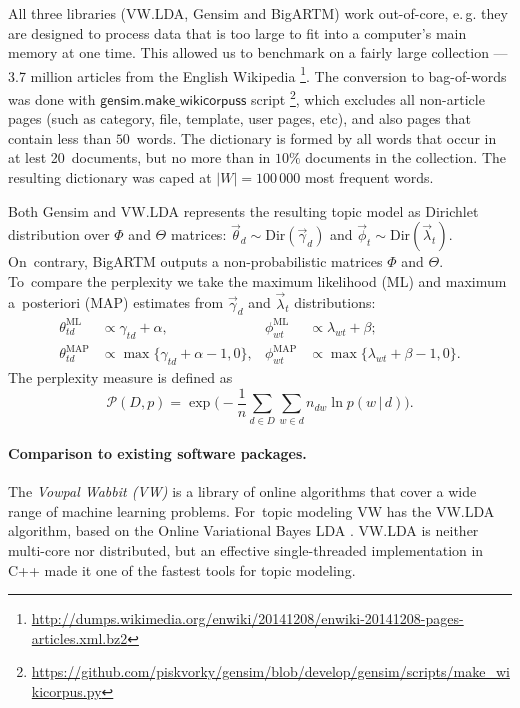 \documentclass[russian]{llncs}
\newcommand{\cond}{\mspace{3mu}{|}\mspace{3mu}}
\newcommand{\kw}[1]{\textsf{#1}}
\begin{document}
All three libraries (VW.LDA, Gensim and BigARTM) work out-of-core,
e.\,g. they are designed to process data that is too large to fit into a computer's main memory at one time.
This allowed us to benchmark on a fairly large collection --- 3.7 million articles from the English Wikipedia%
\footnote{\url{http://dumps.wikimedia.org/enwiki/20141208/enwiki-20141208-pages-articles.xml.bz2}}.
The conversion to bag-of-words was done with $\kw{gensim.make\_wikicorpuss}$ script%
\footnote{\url{https://github.com/piskvorky/gensim/blob/develop/gensim/scripts/make_wikicorpus.py}},
which excludes all non-article pages (such as category, file, template, user pages, etc),
and also pages that contain less than $50$~words.
The dictionary is formed by all words that occur in at lest 20~documents,
but no more than in $10\%$ documents in the collection.
The resulting dictionary was caped at $|W| = 100\,000$ most frequent words.

Both Gensim and VW.LDA represents the resulting topic model as Dirichlet distribution over $\Phi$ and $\Theta$ matrices:
$\vec{\theta}_{d} \sim \text{Dir}(\vec{\gamma}_d)$ and 
$\vec{\phi}_{t} \sim \text{Dir}(\vec{\lambda}_t)$.
On~contrary, BigARTM outputs a non-probabilistic matrices $\Phi$ and $\Theta$.
To~compare the perplexity we take the maximum likelihood (ML) and maximum a~posteriori (MAP) estimates 
from $\vec{\gamma}_d$ and $\vec{\lambda}_t$ distributions:
\begin{align*}
	\theta^{\mathrm{ML}}_{td} &\propto \gamma_{td}+\alpha, &
    \phi^{\mathrm{ML}}_{wt} &\propto \lambda_{wt}+\beta;
\\
	\theta^{\mathrm{MAP}}_{td} &\propto \max\{\gamma_{td}+\alpha-1,0\}, &
    \phi^{\mathrm{MAP}}_{wt} &\propto \max\{\lambda_{wt}+\beta-1,0\}.
\end{align*}
The perplexity measure is defined as
\begin{equation}
    \label{eq:perplexity}
    \mathscr{P}(D, p) = 
        \exp \biggl( - \frac{1}{n} \sum_{d \in D} \sum_{w \in d} n_{dw} \ln p(w \cond d) \biggr).
\end{equation}

\paragraph{Comparison to existing software packages.}

The \emph{Vowpal Wabbit (VW)} is a library
of online algorithms that cover a wide range of machine learning problems. %
For~topic modeling VW has the VW.LDA algorithm, based on the Online Variational Bayes LDA \cite{hoffman10online}.
VW.LDA is neither multi-core nor distributed,
but an effective single-threaded implementation in C++ made it one of the fastest tools for topic modeling.%
\end{document}
